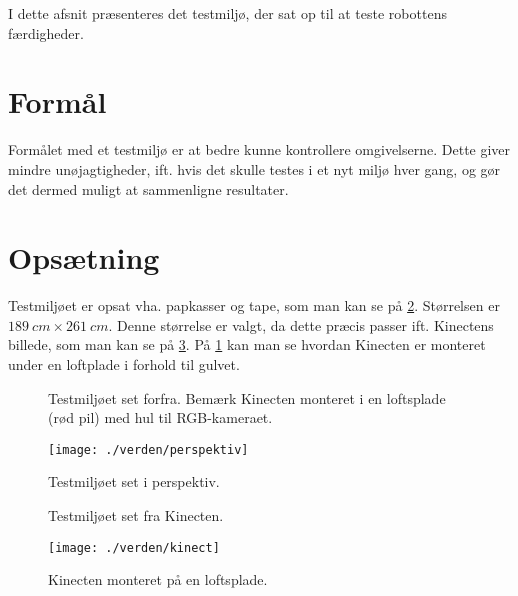 \label{testmiljo}
I dette afsnit præsenteres det testmiljø, der sat op til at teste robottens færdigheder.

\section{Formål}
Formålet med et testmiljø er at bedre kunne kontrollere omgivelserne.
Dette giver mindre unøjagtigheder, ift. hvis det skulle testes i et nyt miljø hver gang, og gør det dermed muligt at sammenligne resultater.

\section{Opsætning}\label{testmiljo:opsaetning}
Testmiljøet er opsat vha. papkasser og tape, som man kan se på \cref{testmiljo:perspektiv}.
Størrelsen er $189 \ cm \times 261 \ cm$. 
Denne størrelse er valgt, da dette præcis passer ift. Kinectens billede, som man kan se på \cref{testmiljo:oppefra}.
På \cref{testmiljo:forfra} kan man se hvordan Kinecten er monteret under en loftplade i forhold til gulvet.

\begin{figure}
\centering
{}
\caption{Testmiljøet set forfra. Bemærk Kinecten monteret i en loftsplade (rød pil) med hul til RGB-kameraet.}
\label{testmiljo:forfra}
\end{figure}

\begin{figure}
\centering
\texttt{[image: ./verden/perspektiv]}
\caption{Testmiljøet set i perspektiv.}
\label{testmiljo:perspektiv}
\end{figure}

\begin{figure}
\centering
{}
\caption{Testmiljøet set fra Kinecten.}
\label{testmiljo:oppefra}
\end{figure}

\begin{figure}
\centering
\texttt{[image: ./verden/kinect]}
\caption{Kinecten monteret på en loftsplade.}
\label{testmiljo:kinect}
\end{figure}